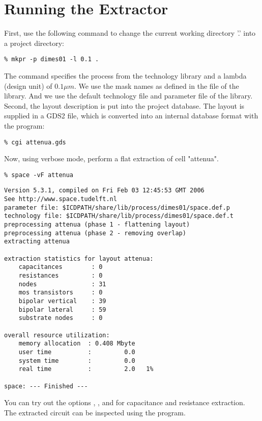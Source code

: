 \section{Running the Extractor}
First, use the following command to change the current working directory '.' into a project directory:
\small
\begin{Verbatim}
% mkpr -p dimes01 -l 0.1 .
\end{Verbatim}
\normalsize
The command specifies the  process from the technology library
and a lambda (design unit) of $0.1 \mu m$.
We use the mask names as defined in the  file of the library.
And we use the default technology file  and parameter file  of the library.
\\[1 ex]
Second, the layout description is put into the project database.
The layout is supplied in a GDS2 file, which is converted into
an internal database format with the  program:
\small
\begin{Verbatim}
% cgi attenua.gds
\end{Verbatim}
\normalsize
Now, using verbose mode, perform a flat extraction of cell "attenua".
\small
\begin{Verbatim}
% space -vF attenua
\end{Verbatim}
\normalsize
\small \begin{Verbatim}[frame=single]
Version 5.3.1, compiled on Fri Feb 03 12:45:53 GMT 2006
See http://www.space.tudelft.nl
parameter file: $ICDPATH/share/lib/process/dimes01/space.def.p
technology file: $ICDPATH/share/lib/process/dimes01/space.def.t
preprocessing attenua (phase 1 - flattening layout)
preprocessing attenua (phase 2 - removing overlap)
extracting attenua

extraction statistics for layout attenua:
	capacitances        : 0
	resistances         : 0
	nodes               : 31
	mos transistors     : 0
	bipolar vertical    : 39
	bipolar lateral     : 59
	substrate nodes     : 0

overall resource utilization:
	memory allocation  : 0.408 Mbyte
	user time          :         0.0
	system time        :         0.0
	real time          :         2.0   1%

space: --- Finished ---
\end{Verbatim}
\normalsize
You can try out the options , ,  and  for capacitance and resistance extraction.
\\[1 ex]
The extracted circuit can be inspected using the  program.
